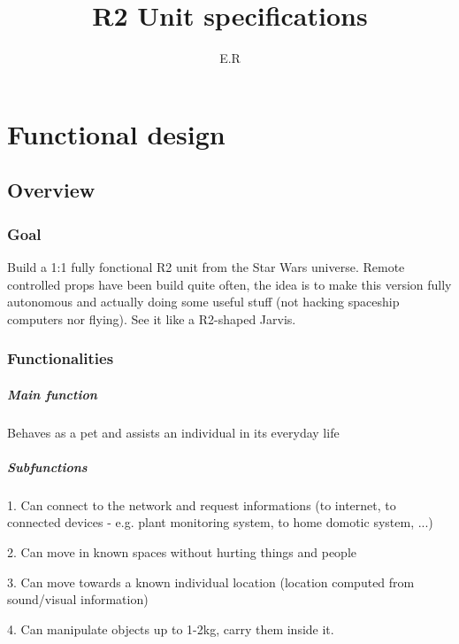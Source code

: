 \documentclass{report}
\title{R2 Unit specifications}
\author{E.R}
\begin{document}
\maketitle

\tableofcontents

\chapter{Functional design}
\section{Overview}
\subsection{Goal}

Build a 1:1 fully fonctional R2 unit from the Star Wars universe. Remote controlled props have been build quite often, the idea is to make this version fully autonomous and actually doing some useful stuff (not hacking spaceship computers nor flying). See it like a R2-shaped Jarvis.

\subsection{Functionalities}

\paragraph{Main function}
Behaves as a pet and assists an individual in its everyday life

\paragraph{Subfunctions}

1. Can connect to the network and request informations (to internet, to connected devices - e.g. plant monitoring system, to home domotic system, ...)

2. Can move in known spaces without hurting things and people

3. Can move towards a known individual location (location computed from sound/visual information)

4. Can manipulate objects up to 1-2kg, carry them inside it.
\end{document}

